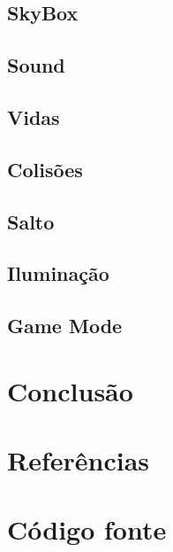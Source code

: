 \documentclass[12pt,a4paper,portuges]{style/myreport}
\begin{document}
\section{SkyBox}


\section{Sound}


\section{Vidas}


\section{Colisões}


\section{Salto}


\section{Iluminação}


\section{Game Mode}


\newpage

\chapter{Conclusão}



\chapter{Referências}


\appendix
\chapter{Código fonte}
\end{document}
